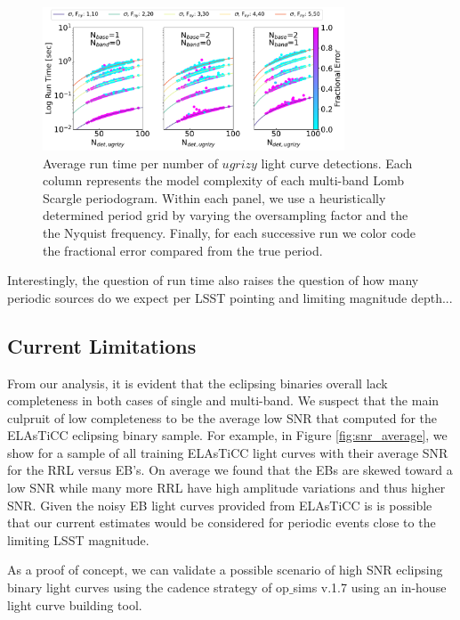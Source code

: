 \documentclass[DM,authoryear,toc]{lsstdoc}
\begin{document}
\begin{figure}
  \includegraphics[width=0.8\textwidth]{figures/multi-lsp-runs.pdf}
  \centering 
  \caption{Average run time per number of $ugrizy$ light curve detections.
Each column represents the model complexity of each multi-band Lomb Scargle periodogram.
Within each panel, we use a heuristically determined period grid by varying the oversampling factor and the the Nyquist frequency.
 Finally, for each successive run we color code the fractional error compared from the true period.}
 \label{fig:run_time_multi}
\end{figure}


Interestingly, the question of run time also raises the question of how many periodic sources do we expect per LSST pointing and limiting magnitude depth...


\subsection{Current Limitations}\label{sec:limitations}

From our analysis, it is evident that the eclipsing binaries overall lack completeness in both cases of single and multi-band.
We suspect that the main culpruit of low completeness to be the average low SNR that computed for the ELAsTiCC eclipsing binary sample.
For example, in Figure \ref{fig:snr_average}, we show for a sample of all training ELAsTiCC light curves with their average SNR for the RRL versus EB's.
On average we found that the EBs are skewed toward a low SNR while many more RRL have high amplitude variations and thus higher SNR.
Given the noisy EB light curves provided from ELAsTiCC is is possible that our current estimates would be considered for periodic events close to the limiting LSST magnitude.


As a proof of concept, we can validate a possible scenario of high SNR eclipsing binary light curves using the cadence strategy of op$\_$sims v.1.7 using an in-house light curve building tool.
\end{document}
